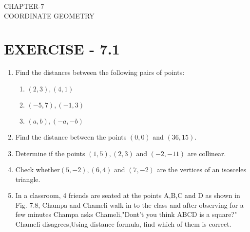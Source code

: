 \documentclass[12pt]{article}
\begin{document}
\begin{center}
\textbf\large{CHAPTER-7 \\ COORDINATE GEOMETRY}
\end{center}

\section{EXERCISE - 7.1}
\fi
\begin{enumerate}[label=\thesection.\arabic*,ref=\thesection.\theenumi]
\item Find the distances between the following pairs of points:
\begin{enumerate}
\item $(2,3),(4,1)$
\item $(-5,7),(-1,3)$
\item $(a,b),(-a,-b)$
\end{enumerate}
		
\item Find the distance between the points $(0,0)$ and $ (36,15)$.
	\\
		\solution
		
\item Determine if the points $(1,5),(2,3)$ and $(-2,-11)$ are collinear.
	\\
		
\item Check whether$(5,-2),(6,4)$ and $(7,-2)$ are the vertices of an isosceles triangle.
	\iffalse
\item  In a classroom, 4 friends are seated at the points A,B,C and D as shown in Fig. 7.8, Champa and Chameli walk in to the class and after observing for a few minutes Champa asks Chameli,"Dont't you think ABCD is a square?" Chameli disagrees,Using distance formula, find which of them is correct.


\end{enumerate}
\end{document}
